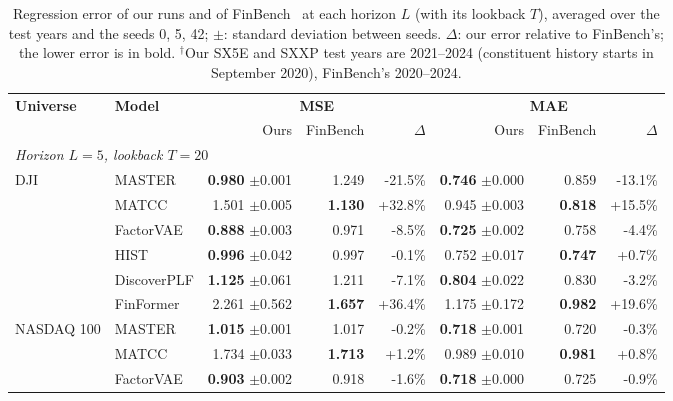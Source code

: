 \begin{table}[tb]
\centering
\caption{Regression error of our runs and of FinBench~\cite{pederzoli2026finbench} at each horizon $L$ (with its lookback $T$), averaged over the test years and the seeds 0, 5, 42; $\pm$: standard deviation between seeds. $\Delta$: our error relative to FinBench's; the lower error is in bold. $^\dagger$Our SX5E and SXXP test years are 2021--2024 (constituent history starts in September 2020), FinBench's 2020--2024.}
\begin{adjustbox}{max width=\textwidth}
{\normalsize
\setlength{\tabcolsep}{6pt}

\begin{tabular}{llrrrrrr}
\toprule
\multirow{2}{*}{\textbf{Universe}} & \multirow{2}{*}{\textbf{Model}} & \multicolumn{3}{c}{\textbf{MSE}} & \multicolumn{3}{c}{\textbf{MAE}} \\
\cmidrule(lr){3-5} \cmidrule(lr){6-8}
 & & Ours & FinBench & $\Delta$ & Ours & FinBench & $\Delta$ \\
\midrule
\multicolumn{8}{l}{\textit{Horizon $L=5$, lookback $T=20$}} \\
\multirow{6}{*}{DJI} & MASTER & \textbf{0.980} {\scriptsize$\pm$0.001} & 1.249 & -21.5\% & \textbf{0.746} {\scriptsize$\pm$0.000} & 0.859 & -13.1\% \\
 & MATCC & 1.501 {\scriptsize$\pm$0.005} & \textbf{1.130} & +32.8\% & 0.945 {\scriptsize$\pm$0.003} & \textbf{0.818} & +15.5\% \\
 & FactorVAE & \textbf{0.888} {\scriptsize$\pm$0.003} & 0.971 & -8.5\% & \textbf{0.725} {\scriptsize$\pm$0.002} & 0.758 & -4.4\% \\
 & HIST & \textbf{0.996} {\scriptsize$\pm$0.042} & 0.997 & -0.1\% & 0.752 {\scriptsize$\pm$0.017} & \textbf{0.747} & +0.7\% \\
 & DiscoverPLF & \textbf{1.125} {\scriptsize$\pm$0.061} & 1.211 & -7.1\% & \textbf{0.804} {\scriptsize$\pm$0.022} & 0.830 & -3.2\% \\
 & FinFormer & 2.261 {\scriptsize$\pm$0.562} & \textbf{1.657} & +36.4\% & 1.175 {\scriptsize$\pm$0.172} & \textbf{0.982} & +19.6\% \\
\midrule
\multirow{6}{*}{NASDAQ 100} & MASTER & \textbf{1.015} {\scriptsize$\pm$0.001} & 1.017 & -0.2\% & \textbf{0.718} {\scriptsize$\pm$0.001} & 0.720 & -0.3\% \\
 & MATCC & 1.734 {\scriptsize$\pm$0.033} & \textbf{1.713} & +1.2\% & 0.989 {\scriptsize$\pm$0.010} & \textbf{0.981} & +0.8\% \\
 & FactorVAE & \textbf{0.903} {\scriptsize$\pm$0.002} & 0.918 & -1.6\% & \textbf{0.718} {\scriptsize$\pm$0.000} & 0.725 & -0.9\% \\

\end{tabular}}
\end{adjustbox}
\end{table}
